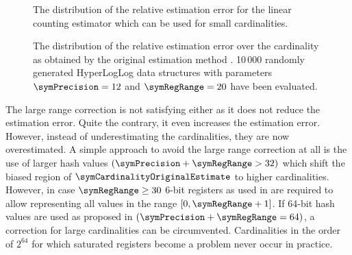 \documentclass[a4paper]{scrartcl}
\begin{document}
\begin{figure}
\centering

\caption{The distribution of the relative estimation error for the linear counting estimator which can be used for small cardinalities.}
\label{fig:small_range_estimate}
\end{figure}

\begin{figure}
\centering

\caption{The distribution of the relative estimation error over the cardinality as obtained by the original estimation method \cite{Flajolet2007}. 10\,000 randomly generated HyperLogLog data structures with parameters $\symPrecision = 12$ and $\symRegRange=20$ have been evaluated.}
\label{fig:original_estimate}
\end{figure}

The large range correction is not satisfying either as it does not reduce the estimation error. Quite the contrary, it even increases the estimation error. However, instead of underestimating the cardinalities, they are now overestimated. A simple approach to avoid the large range correction at all is the use of larger hash values $(\symPrecision+\symRegRange>32)$ which shift the biased region of $\symCardinalityOriginalEstimate$ to higher cardinalities. However, in case $\symRegRange \geq 30$ 6-bit registers as used in \cite{Heule2013} are required to allow representing all values in the range $[0, \symRegRange+1]$. If 64-bit hash values are used as proposed in \cite{Heule2013} $(\symPrecision+\symRegRange=64)$, a correction for large cardinalities can be circumvented. Cardinalities in the order of $2^{64}$ for which saturated registers become a problem never occur in practice.

%
\end{document}
